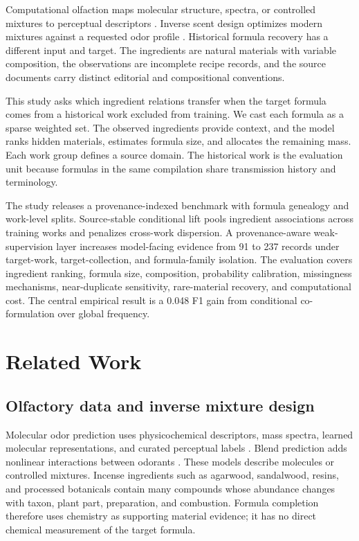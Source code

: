 \documentclass[11pt,a4paper]{article}
\begin{document}
Computational olfaction maps molecular structure, spectra, or controlled mixtures to perceptual descriptors \citep{keller2017_dream,gutierrez2018_semantic,lee2023_pom,sisson2025_blends}. Inverse scent design optimizes modern mixtures against a requested odor profile \citep{aleixandre2024_scent_creation}. Historical formula recovery has a different input and target. The ingredients are natural materials with variable composition, the observations are incomplete recipe records, and the source documents carry distinct editorial and compositional conventions.

This study asks which ingredient relations transfer when the target formula comes from a historical work excluded from training. We cast each formula as a sparse weighted set. The observed ingredients provide context, and the model ranks hidden materials, estimates formula size, and allocates the remaining mass. Each work group defines a source domain. The historical work is the evaluation unit because formulas in the same compilation share transmission history and terminology.

The study releases a provenance-indexed benchmark with formula genealogy and work-level splits. Source-stable conditional lift pools ingredient associations across training works and penalizes cross-work dispersion. A provenance-aware weak-supervision layer increases model-facing evidence from 91 to 237 records under target-work, target-collection, and formula-family isolation. The evaluation covers ingredient ranking, formula size, composition, probability calibration, missingness mechanisms, near-duplicate sensitivity, rare-material recovery, and computational cost. The central empirical result is a 0.048 F1 gain from conditional co-formulation over global frequency.

\section{Related Work}

\subsection{Olfactory data and inverse mixture design}

Molecular odor prediction uses physicochemical descriptors, mass spectra, learned molecular representations, and curated perceptual labels \citep{keller2017_dream,gutierrez2018_semantic,debnath2021_mass_spectra,lee2023_pom,hamel2024_pyrfume}. Blend prediction adds nonlinear interactions between odorants \citep{sisson2025_blends,thomasdanguin2014_mixtures}. These models describe molecules or controlled mixtures. Incense ingredients such as agarwood, sandalwood, resins, and processed botanicals contain many compounds whose abundance changes with taxon, plant part, preparation, and combustion. Formula completion therefore uses chemistry as supporting material evidence; it has no direct chemical measurement of the target formula.
\end{document}

